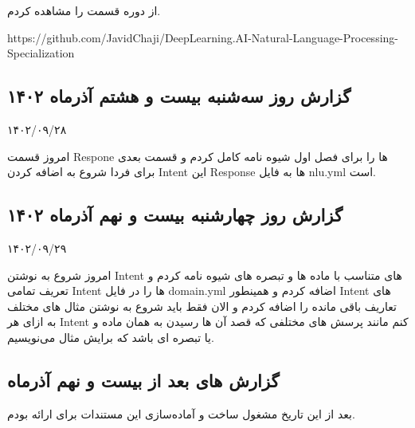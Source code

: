 از دوره  قسمت  را مشاهده کردم.

https://github.com/JavidChaji/DeepLearning.AI-Natural-Language-Processing-Specialization


\subsection{گزارش روز سه‌شنبه بیست و هشتم آذر‌ماه ۱۴۰۲}

۱۴۰۲/۰۹/۲۸

امروز قسمت Respone ها را برای فصل اول شیوه نامه کامل کردم و قسمت بعدی  برای فردا شروع به اضافه کردن Intent این Response ها به فایل nlu.yml است.


\subsection{گزارش روز چهارشنبه بیست و نهم آذر‌ماه ۱۴۰۲}

۱۴۰۲/۰۹/۲۹

امروز شروع به نوشتن Intent های متناسب با ماده ها و تبصره های شیوه نامه کردم و تعریف تمامی Intent ها را در فایل domain.yml اضافه کردم و همینطور Intent های تعاریف باقی مانده را اضافه کردم و الان فقط باید شروع به نوشتن مثال های مختلف به ازای هر Intent کنم مانند پرسش های مختلفی که قصد آن ها رسیدن به همان ماده و یا تبصره ای باشد که برایش مثال می‌نویسیم.

\subsection{گزارش های بعد از بیست و نهم آذرماه}

بعد از این تاریخ مشغول ساخت و آماده‌سازی این مستندات برای ارائه بودم.


